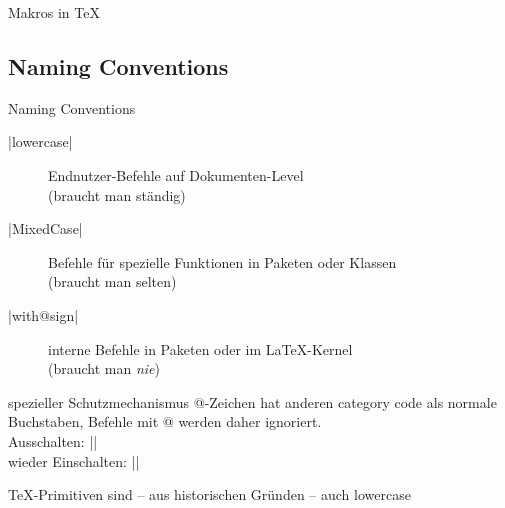 \documentclass[
	vorläufig=true,
	datum=2017-01-26,
	titel={Komplexe Makros und Befehle},
	web=true,
	max,
]{../tex/latexkurs-slides}
\begin{document}
\begin{frame}[fragile]{Makros in \TeX}
\end{frame}


\subsection{Naming Conventions}
\begin{frame}[fragile]{Naming Conventions}
\begin{description}
\item[|lowercase|] Endnutzer-Befehle auf Dokumenten-Level\\(braucht man ständig)
\item[|MixedCase|] Befehle für spezielle Funktionen in Paketen oder Klassen\\(braucht man selten)
\item[|with@sign|] interne Befehle in Paketen oder im \LaTeX-Kernel\\(braucht man \emph{nie})
\end{description}
\vfill\pause
\begin{block}{spezieller Schutzmechanismus}
@-Zeichen hat anderen \textenglish{category code} als normale Buchstaben, Befehle mit @ werden daher ignoriert.\\
Ausschalten: |\makeatletter|\\
wieder Einschalten: |\makeatother|
\end{block}
\vfill\pause
\TeX-Primitiven sind – aus historischen Gründen – auch lowercase
\end{frame}
\end{document}
